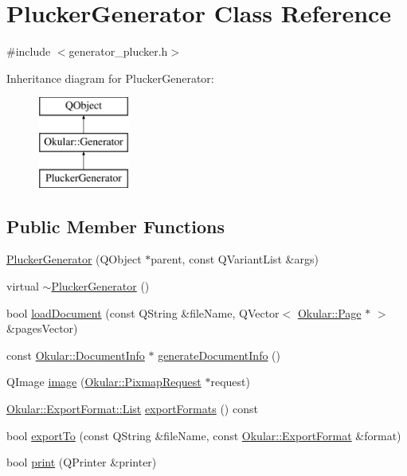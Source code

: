 \hypertarget{classPluckerGenerator}{\section{Plucker\+Generator Class Reference}
\label{classPluckerGenerator}
}


{\ttfamily \#include $<$generator\+\_\+plucker.\+h$>$}

Inheritance diagram for Plucker\+Generator\+:\begin{figure}[H]
\begin{center}
\leavevmode
\includegraphics[height=3.000000cm]{classPluckerGenerator}
\end{center}
\end{figure}
\subsection*{Public Member Functions}
\begin{DoxyCompactItemize}
\item 
\hyperlink{classPluckerGenerator_a43eb7e954d45fb606ad292559fbed7e0}{Plucker\+Generator} (Q\+Object $\ast$parent, const Q\+Variant\+List \&args)
\item 
virtual \hyperlink{classPluckerGenerator_ab908f0c868b57a1f581858ba5282c3a9}{$\sim$\+Plucker\+Generator} ()
\item 
bool \hyperlink{classPluckerGenerator_a12d8af3fc857997f02e8533a6af51f80}{load\+Document} (const Q\+String \&file\+Name, Q\+Vector$<$ \hyperlink{classOkular_1_1Page}{Okular\+::\+Page} $\ast$ $>$ \&pages\+Vector)
\item 
const \hyperlink{classOkular_1_1DocumentInfo}{Okular\+::\+Document\+Info} $\ast$ \hyperlink{classPluckerGenerator_ae4c779c36083a33d803285c2a26dbac2}{generate\+Document\+Info} ()
\item 
Q\+Image \hyperlink{classPluckerGenerator_abf2fdf796ef43397be0ef607891aa24a}{image} (\hyperlink{classOkular_1_1PixmapRequest}{Okular\+::\+Pixmap\+Request} $\ast$request)
\item 
\hyperlink{classOkular_1_1ExportFormat_a987d72c1a1456b8a983a37603a8fa78d}{Okular\+::\+Export\+Format\+::\+List} \hyperlink{classPluckerGenerator_a567989bc41fdacc4ccce73b6c0d127b6}{export\+Formats} () const 
\item 
bool \hyperlink{classPluckerGenerator_ae2cc83755457247e25e992ff1440387f}{export\+To} (const Q\+String \&file\+Name, const \hyperlink{classOkular_1_1ExportFormat}{Okular\+::\+Export\+Format} \&format)
\item 
bool \hyperlink{classPluckerGenerator_abcdfb8cf9b8b83da28f53e2cbef442f7}{print} (Q\+Printer \&printer)
\end{DoxyCompactItemize}
